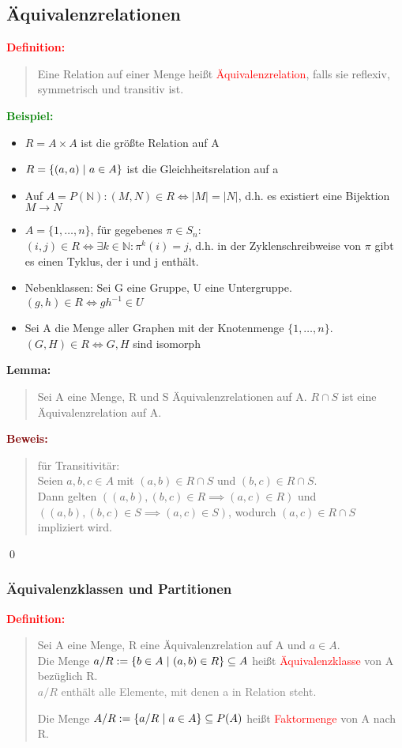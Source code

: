 \documentclass{article}
\newcommand{\smsp}{\phantom{\hspace{3px}}}
\newcommand{\red}[1]{\textcolor{red}{#1}}
\newcommand{\gray}[1]{\textcolor{gray}{#1}}
\newcommand{\green}[1]{\textcolor{green}{#1}}
\newcommand{\dgr}[1]{\textcolor{dgr}{#1}}
\newcommand{\maroon}[1]{\textcolor{maroon}{#1}}
\newcommand{\ex}{\green{\textbf{Beispiel: }}}
\newcommand{\de}[1]{\red{\textbf{Definition: }}\begin{quote}#1\end{quote}}
\newcommand{\lem}[1]{\dgr{\textbf{Lemma: }}\begin{quote}#1\end{quote}}
\newcommand{\pr}[1]{\maroon{\textbf{Beweis: }}\begin{quote}#1\end{quote}\qed}
\newcommand{\N}{\mathbb{N}}
\renewcommand{\st}{\smsp | \smsp}
\begin{document}
\subsection{Äquivalenzrelationen}

\de{
    Eine Relation auf einer Menge heißt \red{Äquivalenzrelation}, falls sie reflexiv, symmetrisch und transitiv ist.
}

\ex \begin{itemize}
    \item $R = A \times A$ ist die größte Relation auf A
    \item $R = \{(a,a) \st a \in A\}$ ist die Gleichheitsrelation auf a
    \item Auf $A = P(\N): (M,N) \in R \iff |M| = |N|$, d.h. es existiert eine Bijektion $M \to N$
    \item $A = \{1, \dots, n\}$, für gegebenes $\pi \in S_n$:\\
    $(i,j) \in R \iff \exists k \in \N: \pi^k(i) = j$, d.h. in der Zyklenschreibweise von $\pi$ gibt es einen Tyklus, der i und j enthält.
    \item Nebenklassen: Sei G eine Gruppe, U eine Untergruppe. $(g,h) \in R \iff gh^{-1} \in U$
    \item Sei A die Menge aller Graphen mit der Knotenmenge $\{1, \dots, n\}$.\\
    $(G,H) \in R \iff G, H$ sind isomorph
\end{itemize}

\newpage
\lem{
    Sei A eine Menge, R und S Äquivalenzrelationen auf A. $R \cap S$ ist eine Äquivalenzrelation auf A.
}

\pr{
    für Transitivitär:\\
    Seien $a,b,c \in A$ mit $(a,b) \in R \cap S$ und $(b,c) \in R \cap S$.\\
    Dann gelten $((a,b),(b,c) \in R \implies (a,c) \in R)$ und\\
    $((a,b),(b,c) \in S \implies (a,c) \in S)$, wodurch $(a,c) \in R \cap S$ impliziert wird.
}

\subsubsection{Äquivalenzklassen und Partitionen}

\de{
    Sei A eine Menge, R eine Äquivalenzrelation auf A und $a \in A$.\\
    Die Menge $a/R := \{b \in A \st (a,b) \in R\} \subseteq A$ heißt \red{Äquivalenzklasse} von A bezüglich R.\\
    \gray{$a/R$ enthält alle Elemente, mit denen a in Relation steht.}

    Die Menge $A/R := \{a/R \st a \in A\} \subseteq P(A)$ heißt \red{Faktormenge} von A nach R.
}
\end{document}
